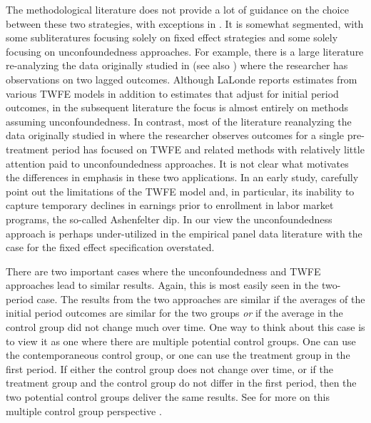 \documentclass[letterpaper,12pt,leqno]{article}
\begin{document}
 The methodological literature does not provide a lot of guidance on the choice between these two strategies, with exceptions in \citep{angristpischke,  xu2023causal}. It is somewhat segmented, with some subliteratures focusing solely on fixed effect strategies and some solely focusing on unconfoundedness approaches. For example, there is a large literature re-analyzing the data originally studied in
\citep{lalonde1986evaluating} (see also \citep{dehejiawahba, imbens2024lalonde}) where the researcher has observations on two lagged outcomes. Although LaLonde reports estimates from various TWFE models in addition to estimates that adjust for initial period outcomes, in the subsequent literature the focus is almost entirely on methods assuming unconfoundedness. 
In contrast, most of the literature reanalyzing the data originally studied in \citep{card1994minimum} where the researcher observes outcomes for a single pre-treatment period has focused on TWFE and related methods with relatively little attention paid to unconfoundedness approaches. It is not clear what motivates the differences in emphasis in these two applications.
In an early study, \citep{ashenfelter1985using} carefully point out the limitations of the TWFE model and, in particular, its inability to capture temporary declines in earnings prior to enrollment in labor market programs, the so-called Ashenfelter dip. In our view the unconfoundedness approach is perhaps under-utilized in the empirical panel data literature with the case for the fixed effect specification overstated.

There are two important cases where the unconfoundedness and TWFE approaches lead to similar results. Again, this is most easily seen in the two-period case. The results from the two approaches are similar
if the averages of the initial period outcomes are similar for the two groups {\it or} if the average in the control group did not change much over time.
One way to think about this case is to view it as one where there are multiple potential control groups. One can use the contemporaneous control group, or one can use the treatment group in the first period. If either the control group does not change over time, or if the treatment group and the control group do not differ in the first period, then the two potential control groups deliver the same results.
See for more on this multiple control group perspective \citep{rosenbaum2002multiple}.
\end{document}
